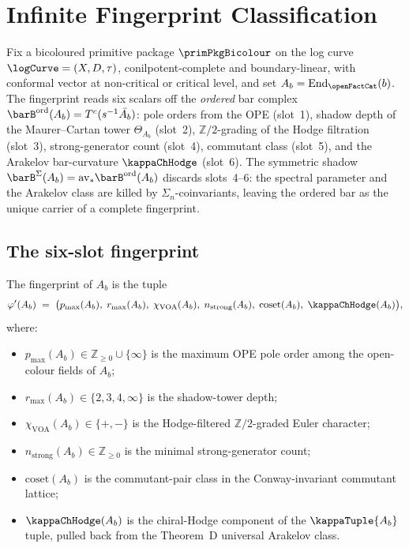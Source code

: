 \chapter{Infinite Fingerprint Classification}
\label{chap:infinite-fingerprint}
\index{$\kappaChHodge$}

Fix a bicoloured primitive package $\primPkgBicolour$ on the log curve
$\logCurve = (X, D, \tau)$, conilpotent-complete and boundary-linear,
with conformal vector at non-critical or critical level, and set $A_b =
\mathrm{End}_{\openFactCat}(b)$. The fingerprint reads six scalars off
the \emph{ordered} bar complex $\barB^{\mathrm{ord}}(A_b) =
T^c(s^{-1}\bar{A_b})$: pole orders from the OPE (slot~1), shadow depth
of the Maurer--Cartan tower $\Theta_{A_b}$ (slot~2), $\mathbb{Z}/2$-grading
of the Hodge filtration (slot~3), strong-generator count (slot~4),
commutant class (slot~5), and the Arakelov bar-curvature $\kappaChHodge$
(slot~6). The symmetric shadow $\barB^{\Sigma}(A_b) = \mathrm{av}_*
\barB^{\mathrm{ord}}(A_b)$ discards slots~4--6: the spectral parameter
and the Arakelov class are killed by $\Sigma_n$-coinvariants, leaving
the ordered bar as the unique carrier of a complete fingerprint.

\section{The six-slot fingerprint}
\label{sec:six-slot-fingerprint}

\begin{definition}
\label{def:fingerprint-slots}
\index{$\kappaChHodge$}
The fingerprint of $A_b$ is the tuple
\[
 \varphi'(A_b)
 \;=\;
 \bigl(p_{\max}(A_b),\;
 r_{\max}(A_b),\;
 \chi_{\mathrm{VOA}}(A_b),\;
 n_{\mathrm{strong}}(A_b),\;
 \mathrm{coset}(A_b),\;
 \kappaChHodge(A_b)\bigr),
\]
where:
\begin{itemize}
\item $p_{\max}(A_b) \in \mathbb{Z}_{\ge 0} \cup \{\infty\}$ is the
maximum OPE pole order among the open-colour fields of $A_b$;
\item $r_{\max}(A_b) \in \{2, 3, 4, \infty\}$ is the shadow-tower depth;
\item $\chi_{\mathrm{VOA}}(A_b) \in \{+, -\}$ is the Hodge-filtered
$\mathbb{Z}/2$-graded Euler character;
\item $n_{\mathrm{strong}}(A_b) \in \mathbb{Z}_{\ge 0}$ is the minimal
strong-generator count;
\item $\mathrm{coset}(A_b)$ is the commutant-pair class in the
Conway-invariant commutant lattice;
\item $\kappaChHodge(A_b)$ is the chiral-Hodge component of the
$\kappaTuple{A_b}$ tuple, pulled back from the Theorem~D universal
Arakelov class.
\end{itemize}
\end{definition}

